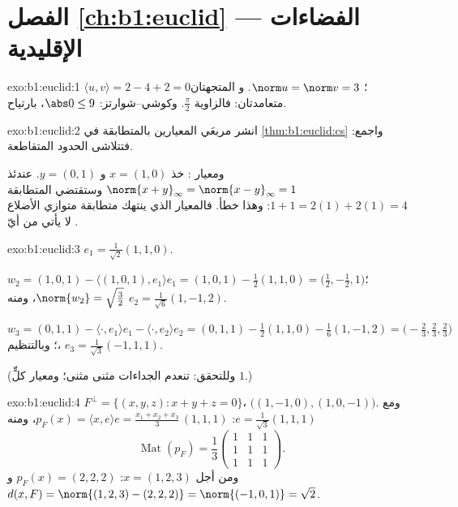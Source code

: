 \section*{الفصل \ref{ch:b1:euclid} --- الفضاءات الإقليدية}

\begin{solution}{exo:b1:euclid:1}
$\langle u, v\rangle = 2 - 4 + 2 = 0$؛ $\norm u = \norm v = 3$. و
المتجهتان متعامدتان: فالزاوية $\frac\pi2$. وكوشي--شوارتز:
$\abs 0 \leq 9$، بارتياح.
\end{solution}

\begin{solution}{exo:b1:euclid:2}
انشر مربعَي المعيارين بالمتطابقة في
\cref{thm:b1:euclid:cs} واجمع: فتتلاشى الحدود المتقاطعة.

ومعيار : خذ $x = (1, 0)$ و $y = (0, 1)$. عندئذ $\norm{x + y}_\infty
= \norm{x - y}_\infty = 1$ وستقتضي المتطابقة $1 + 1 =
2(1) + 2(1) = 4$: وهذا خطأ. فالمعيار الذي ينتهك متطابقة
متوازي الأضلاع لا يأتي من أيّ .
\end{solution}

\begin{solution}{exo:b1:euclid:3}
$e_1 = \frac{1}{\sqrt 2}(1,1,0)$.

$w_2 = (1,0,1) - \langle (1,0,1), e_1\rangle e_1 = (1,0,1) -
\frac{1}{2}(1,1,0) = \bigl(\tfrac12, -\tfrac12, 1\bigr)$؛
$\norm{w_2} = \sqrt{\tfrac32}$، ومنه $e_2 =
\frac{1}{\sqrt 6}(1, -1, 2)$.

$w_3 = (0,1,1) - \langle\cdot, e_1\rangle e_1 - \langle\cdot,
e_2\rangle e_2 = (0,1,1) - \frac12 (1,1,0) - \frac16(1,-1,2) =
\bigl(-\tfrac23, \tfrac23, \tfrac23\bigr)$؛ وبالتنظيم، $e_3 =
\frac{1}{\sqrt 3}(-1, 1, 1)$.

(وللتحقق: تنعدم الجداءات مثنى مثنى؛ ومعيار كلٍّ $1$.)
\end{solution}

\begin{solution}{exo:b1:euclid:4}
$F^\perp = \{(x,y,z) : x + y + z = 0\}$،  $\bigl((1,-1,0),
(1,0,-1)\bigr)$. ومع $e = \frac{1}{\sqrt3}(1,1,1)$: $p_F(x) =
\langle x, e\rangle e = \frac{x_1 + x_2 + x_3}{3}\,(1,1,1)$، ومنه
\[
\operatorname{Mat}(p_F) = \frac13
\begin{pmatrix} 1&1&1\\ 1&1&1\\ 1&1&1\end{pmatrix}.
\]
ومن أجل $x = (1,2,3)$: $p_F(x) = (2,2,2)$ و $d(x, F) = \norm{(1,2,3)
- (2,2,2)} = \norm{(-1,0,1)} = \sqrt 2$.
\end{solution}

